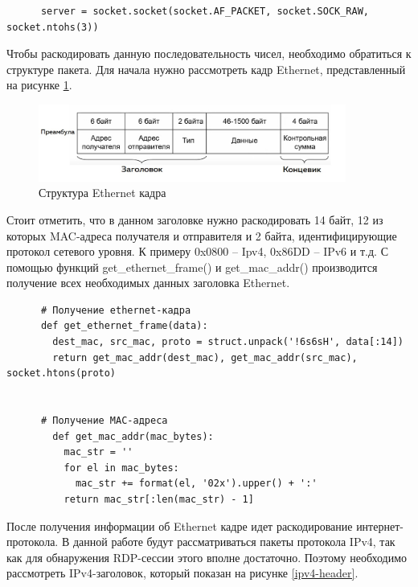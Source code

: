 \documentclass[bachelor, och, coursework]{SCWorks}
\begin{document}
    \begin{verbatim}
      server = socket.socket(socket.AF_PACKET, socket.SOCK_RAW, socket.ntohs(3))
    \end{verbatim}
    
    Чтобы раскодировать данную последовательность чисел, необходимо обратиться к структуре пакета. Для начала нужно рассмотреть кадр Ethernet, представленный
    на рисунке \ref{eth-frame}.
    
    \begin{figure}[H]
      \centering
      \includegraphics[width=0.9\textwidth]{photo/eth-frame.jpg}
      \caption{Структура Ethernet кадра}
      \label{eth-frame}
    \end{figure}
    
    Стоит отметить, что в данном заголовке нужно раскодировать 14 байт, 12 из которых MAC-адреса получателя и отправителя и 2 байта, идентифицирующие протокол
    сетевого уровня. К примеру 0x0800 -- Ipv4, 0x86DD -- IPv6 и т.д. С помощью функций get_ethernet_frame() и get_mac_addr() производится получение всех необходимых
    данных заголовка Ethernet.
    
    \begin{verbatim}
      # Получение ethernet-кадра
      def get_ethernet_frame(data):
        dest_mac, src_mac, proto = struct.unpack('!6s6sH', data[:14])
        return get_mac_addr(dest_mac), get_mac_addr(src_mac), socket.htons(proto)
      
      
      # Получение MAC-адреса
        def get_mac_addr(mac_bytes):
          mac_str = ''
          for el in mac_bytes:
            mac_str += format(el, '02x').upper() + ':'
          return mac_str[:len(mac_str) - 1]
      \end{verbatim}

    После получения информации об Ethernet кадре идет раскодирование интернет-протокола. В данной работе будут рассматриваться пакеты протокола IPv4, 
    так как для обнаружения RDP-сессии этого вполне достаточно. Поэтому необходимо рассмотреть IPv4-заголовок, который показан на рисунке \ref{ipv4-header}.
\end{document}

